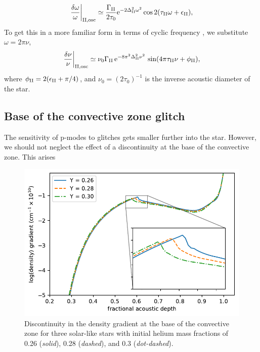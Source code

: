 %
\begin{equation}
    \left.\frac{\delta\omega}{\omega}\right|_{{\mathrm{II}}, \mathrm{osc}} \simeq \frac{\Gamma_{{\mathrm{II}}}}{2 \tau_0} \mathrm{e}^{- 2 \Delta_{{\mathrm{II}}}^2 \omega^2} \cos 2 (\tau_{{\mathrm{II}}}\omega + \epsilon_{{\mathrm{II}}}),
\end{equation}
%
To get this in a more familiar form in terms of cyclic frequency \citep[e.g.][]{Verma.Faria.ea2014,Verma.Raodeo.ea2017}, we substitute \(\omega = 2\pi\nu\),
%
\begin{equation}
    \left.\frac{\delta\nu}{\nu}\right|_{{\mathrm{II}}, \mathrm{osc}} \simeq \nu_0 \Gamma_{{\mathrm{II}}} \, \mathrm{e}^{- 8 \pi^2 \Delta_{{\mathrm{II}}}^2 \nu^2} \, \sin ( 4 \pi \tau_{{\mathrm{II}}} \nu + \phi_{{\mathrm{II}}}),
\end{equation}
%
where \(\phi_{{\mathrm{II}}} = 2(\epsilon_{{\mathrm{II}}} + \pi/4)\), and \(\nu_0 = (2 \tau_0)^{-1}\) is the inverse acoustic diameter of the star.

\subsection{Base of the convective zone glitch}\label{sec:bcz-glitch}

The sensitivity of p-modes to glitches gets smaller further into the star. However, we should not neglect the effect of a discontinuity at the base of the convective zone. This arises 

\begin{figure}
    \centering
    \includegraphics{figures/bcz-density-gradient.pdf}
    \caption{Discontinuity in the density gradient at the base of the convective zone for three solar-like stars with initial helium mass fractions of 0.26 (\emph{solid}), 0.28 (\emph{dashed}), and 0.3 (\emph{dot-dashed}).}
    \label{fig:bcz-density}
\end{figure}


